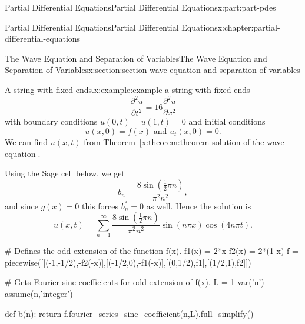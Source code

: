\documentclass[twoside,10pt,]{book}
\newcommand{\xreffont}{\relax}
\numberwithin{equation}{part}
\providecommand{\pdv}[3][]{\dfrac{\partial^{#1} #2}{\partial #3^{#1}}}
\begin{document}
\begin{partptx}{Partial Differential Equations}{}{Partial Differential Equations}{}{}{x:part:part-pdes}
\begin{chapterptx}{Partial Differential Equations}{}{Partial Differential Equations}{}{}{x:chapter:partial-differential-equations}
\begin{sectionptx}{The Wave Equation and Separation of Variables}{}{The Wave Equation and Separation of Variables}{}{}{x:section:section-wave-equation-and-separation-of-variables}
\begin{example}{A string with fixed ends.}{x:example:example-a-string-with-fixed-ends}
\begin{equation*}
\pdv[2]{u}{t} = 16\pdv[2]{u}{x}
\end{equation*}
with boundary conditions \(u(0,t) = u(1,t) = 0\) and initial conditions%
\begin{equation*}
u(x,0) = f(x)\text{ and }u_{t}(x,0) = 0.
\end{equation*}
We can find \(u(x,t)\) from \hyperref[x:theorem:theorem-solution-of-the-wave-equation]{Theorem~{\xreffont\ref{x:theorem:theorem-solution-of-the-wave-equation}}}.%
\par
Using the Sage cell below, we get%
\begin{equation*}
b_{n} = \frac{8\sin\left(\frac{1}{2} \pi n\right)}{\pi^{2} n^{2}},
\end{equation*}
and since \(g(x) = 0\) this forces \(b^{*}_{n} = 0\) as well. Hence the solution is%
\begin{equation*}
u(x,t) = \sum_{n=1}^{\infty}\frac{8\sin\left(\frac{1}{2} \pi n\right)}{\pi^{2} n^{2}}\sin(n\pi x)\cos(4n\pi t).
\end{equation*}
%
\end{example}
\begin{sageinput}
# Defines the odd extension of the function f(x).
f1(x) = 2*x
f2(x) = 2*(1-x)
f = piecewise([[(-1,-1/2),-f2(-x)],[(-1/2,0),-f1(-x)],[(0,1/2),f1],[(1/2,1),f2]])

# Gets Fourier sine coefficients for odd extension of f(x).
L = 1
var('n')
assume(n,'integer')

def b(n):
  return f.fourier_series_sine_coefficient(n,L).full_simplify()


\end{sageinput}
\end{sectionptx}
\end{chapterptx}
\end{partptx}
\end{document}
